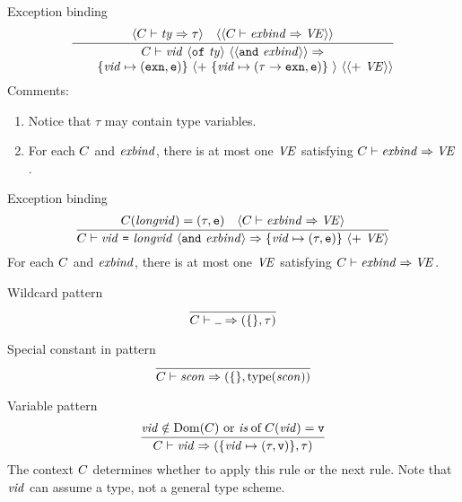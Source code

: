 
\begin{sml-rule}{Exception binding}
\begin{equation}\label{rule:static-core:exnbind1}
  \vcenter{\infer{\deduce{\qquad\{\vid\mapsto(\EXCN,\ise)\}\
      \optional{+\ \{\vid\mapsto(\tau\rightarrow\EXCN,\ise)\}\ }\
      \optional{\optional{ +\ \VE}}}
      {\C\ts\longvidexnbinda\ra}}
    {\optional{\C\ts\ty\ra\tau}
  & \optional{\optional{\C\ts\exnbind\ra\VE}}}}
\end{equation}
Comments:
\begin{enumerate}
\item Notice that $\tau$ may contain type variables.
\item For each $C$ and $\textit{exbind\/}$, there is at most one $\textit{V\kern-.05emE\/}$
  satisfying $C\vdash\textit{exbind\/}\Rightarrow\textit{V\kern-.05emE\/}$.
\end{enumerate}
\end{sml-rule}

\begin{sml-rule}{Exception binding}
\begin{equation}\label{rule:static-core:exnbind2}
  \vcenter{\infer{\C\ts\longvidexnbindb\ra\{\vid\mapsto(\tau,\ise)\}\ \optional{+\ \VE}}
    {\C(\longvid)=(\tau,\ise)
      & \optional{\C\ts\exnbind\ra\VE}}}
\end{equation}
For each $C$ and $\textit{exbind\/}$, there is at most one $\textit{V\kern-.05emE\/}$ satisfying
$C\vdash\textit{exbind\/}\Rightarrow\textit{V\kern-.05emE\/}$.
\end{sml-rule}


\begin{sml-rule}{Wildcard pattern}
\begin{equation}\label{rule:static-core:wildcard-pattern}
\vcenter{\infer{\C\ts\wildcard\ra (\emptymap,\tau)}{}}
\end{equation}
\end{sml-rule}

\begin{sml-rule}{Special constant in pattern}
\begin{equation}\label{rule:static-core:atpat:scon}
\vcenter{\infer{\C\ts\scon\ra (\emptymap,\scontype(\scon))}{}}
\end{equation}
\end{sml-rule}

\begin{sml-rule}{Variable pattern}
\begin{equation}\label{rule:static-core:variable-pattern}
  \vcenter{\infer{\C\ts\vid\ra (\{\vid\mapsto(\tau,\isv)\},\tau)}
    {\hbox{$\vid\notin\Dom(\C)$ or $\of{\is}{C(\vid)} = \isv$}}}
\end{equation}
The context $C$ determines whether to apply this rule or the next rule.
Note that $\textit{vid\/}$ can assume a type, not a general type scheme.
\end{sml-rule}

